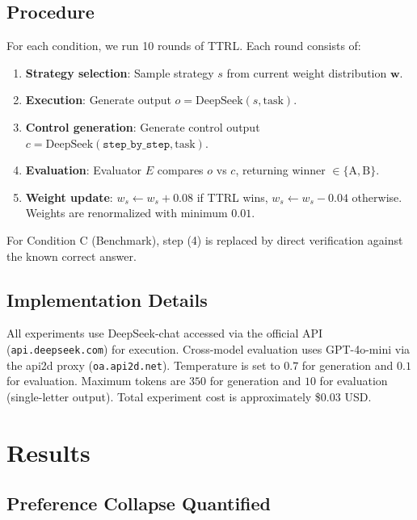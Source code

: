 \documentclass[11pt,a4paper]{article}
\begin{document}
\subsection{Procedure}

For each condition, we run 10 rounds of TTRL. Each round consists of:

\begin{enumerate}[leftmargin=*, label=(\arabic*)]
    \item \textbf{Strategy selection}: Sample strategy $s$ from current weight distribution $\mathbf{w}$.
    \item \textbf{Execution}: Generate output $o = \text{DeepSeek}(s, \text{task})$.
    \item \textbf{Control generation}: Generate control output $c = \text{DeepSeek}(\texttt{step\_by\_step}, \text{task})$.
    \item \textbf{Evaluation}: Evaluator $E$ compares $o$ vs $c$, returning winner $\in \{\text{A}, \text{B}\}$.
    \item \textbf{Weight update}: $w_s \leftarrow w_s + 0.08$ if TTRL wins, $w_s \leftarrow w_s - 0.04$ otherwise. Weights are renormalized with minimum $0.01$.
\end{enumerate}

For Condition C (Benchmark), step (4) is replaced by direct verification against the known correct answer.

\subsection{Implementation Details}

All experiments use DeepSeek-chat accessed via the official API (\texttt{api.deepseek.com}) for execution. Cross-model evaluation uses GPT-4o-mini via the api2d proxy (\texttt{oa.api2d.net}). Temperature is set to $0.7$ for generation and $0.1$ for evaluation. Maximum tokens are $350$ for generation and $10$ for evaluation (single-letter output). Total experiment cost is approximately \$0.03 USD.

\section{Results}

\subsection{Preference Collapse Quantified}
\end{document}
